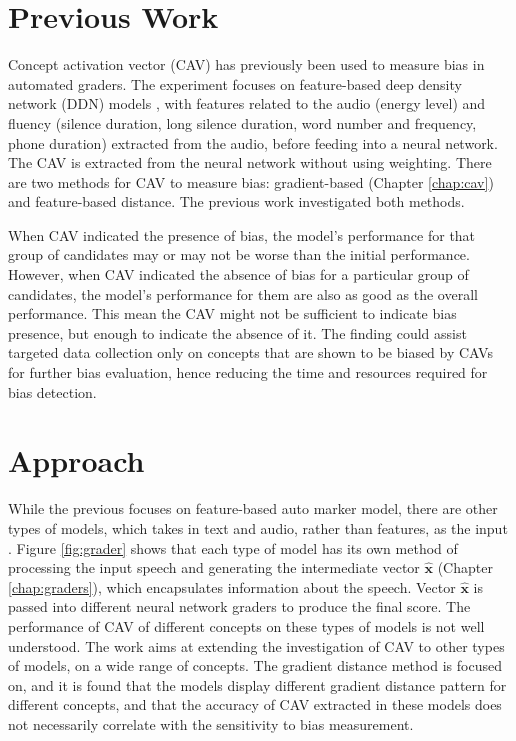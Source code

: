 \section{Previous Work}
Concept activation vector (CAV)  has previously been used to measure bias in automated graders. The experiment focuses on feature-based deep density network (DDN)  models \cite{feature_bias}, with features related to the audio (energy level) and fluency (silence duration, long silence duration, word number and frequency, phone duration) extracted from the audio, before feeding into a neural network. The CAV is extracted from the neural network without using weighting. There are two methods for CAV to measure bias: gradient-based (Chapter \ref{chap:cav}) and feature-based distance. The previous work investigated both methods.


When CAV indicated the presence of bias, the model's performance for that group of candidates may or may not be worse than the initial performance. However, when CAV indicated the absence of bias for a particular group of candidates, the model's performance for them are also as good as the overall performance. This mean the CAV might not be sufficient to indicate bias presence, but enough to indicate the absence of it. The finding could assist targeted data collection only on concepts that are shown to be biased by CAVs for further bias evaluation, hence reducing the time and resources required for bias detection.

\section{Approach}
While the previous focuses on feature-based auto marker model, there are other types of models, which takes in text and audio, rather than features, as the input \cite{graders}. Figure \ref{fig:grader} shows that each type of model has its own method of processing the input speech and generating the intermediate vector $\mathbf{\hat{x}}$ (Chapter \ref{chap:graders}), which encapsulates information about the speech. Vector $\mathbf{\hat{x}}$ is passed into different neural network graders to produce the final score. The performance of CAV of different concepts on these types of models is not well understood. The work aims at extending the investigation of CAV to other types of models, on a wide range of concepts. The gradient distance method is focused on, and it is found that the models display different gradient distance pattern for different concepts, and that the accuracy of CAV extracted in these models does not necessarily correlate with the sensitivity to bias measurement.

